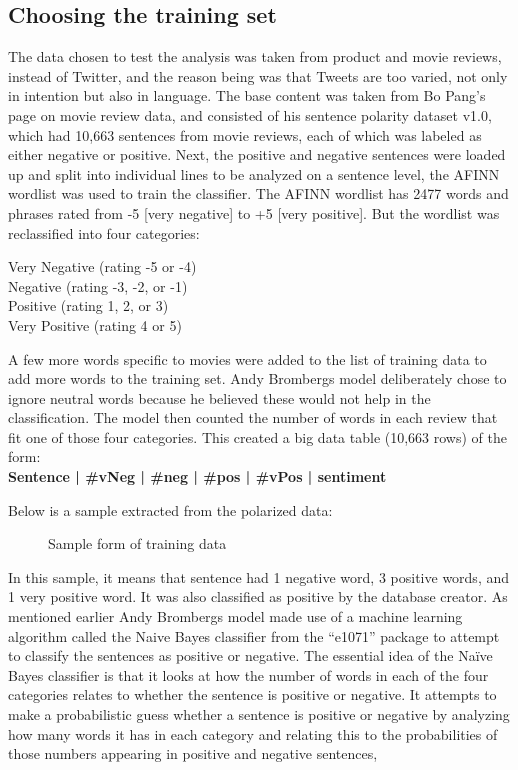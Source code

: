\subsection{Choosing the training set}
The data chosen to test the analysis was taken from product and movie reviews, instead of Twitter,
and the reason being was that Tweets are too varied, not only in intention but also in language.
The base content was taken from Bo Pang’s page on movie review data, and consisted of his
sentence polarity dataset v1.0, which had 10,663 sentences from movie reviews, each of which was labeled as
either negative or positive. Next, the positive and negative sentences were loaded up and split into
individual lines to be analyzed on a sentence level, the AFINN wordlist was used to train the
classifier. The AFINN wordlist has 2477 words and phrases rated from -5 [very negative] to +5
[very positive]. But the wordlist was reclassified into four categories:


\begin{center}


Very Negative (rating -5 or -4)\\
Negative (rating -3, -2, or -1)\\
Positive (rating 1, 2, or 3)\\
Very Positive (rating 4 or 5)

\end{center}

A few more words specific to movies were added to the list of training data to add more words to
the training set. Andy Bromberg\textquotesingle s model deliberately chose to ignore neutral words because he believed these would not help in the classification. The model then counted the number of words in each review that fit one of those four categories. This created a big data table (10,663 rows) of the form: \leavevmode\\
\textbf{
Sentence | \#vNeg | \#neg | \#pos | \#vPos | sentiment
}

Below is a sample extracted from the polarized data:
\begin{figure}[h]
  \centering
  \caption[Sample training data]%
  {Sample form of training data}
  \label{fig:ALAP:sm3}
\end{figure}


In this sample, it means that sentence had 1 negative word, 3 positive words, and 1 very positive
word. It was also classified as positive by the database creator.
As mentioned earlier Andy Bromberg\textquotesingle s model made use of a machine learning algorithm called
the Naive Bayes classifier from the “e1071”  package to attempt to classify the sentences as positive
or negative.
The essential idea of the Naïve Bayes classifier is that it looks at how the number of words in each
of the four categories relates to whether the sentence is positive or negative. It attempts to make a probabilistic guess whether a sentence is positive or negative by analyzing  how many words it has in each category
and relating this to the probabilities of those numbers appearing in positive and negative sentences,
\cite{ref31}


